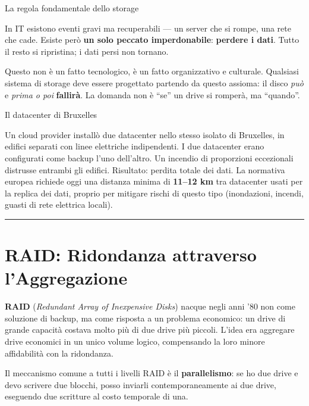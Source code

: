 \documentclass[
  italian,
  openany]{book}
\begin{document}
\begin{calloutwarning}{La regola fondamentale dello storage}

In IT esistono eventi gravi ma recuperabili --- un server che si rompe,
una rete che cade. Esiste però \textbf{un solo peccato imperdonabile}:
\textbf{perdere i dati}. Tutto il resto si ripristina; i dati persi non
tornano.

\end{calloutwarning}

Questo non è un fatto tecnologico, è un fatto organizzativo e culturale.
Qualsiasi sistema di storage deve essere progettato partendo da questo
assioma: il disco \emph{può} e \emph{prima o poi} \textbf{fallirà}. La
domanda non è ``se'' un drive si romperà, ma ``quando''.

\begin{callouttip}{Il datacenter di Bruxelles}

Un cloud provider installò due datacenter nello stesso isolato di
Bruxelles, in edifici separati con linee elettriche indipendenti. I due
datacenter erano configurati come backup l'uno dell'altro. Un incendio
di proporzioni eccezionali distrusse entrambi gli edifici. Risultato:
perdita totale dei dati. La normativa europea richiede oggi una distanza
minima di \textbf{11--12 km} tra datacenter usati per la replica dei
dati, proprio per mitigare rischi di questo tipo (inondazioni, incendi,
guasti di rete elettrica locali).

\end{callouttip}

\begin{center}\rule{0.5\linewidth}{0.5pt}\end{center}

\section{RAID: Ridondanza attraverso
l'Aggregazione}\label{raid-ridondanza-attraverso-laggregazione}

\textbf{RAID} (\emph{Redundant Array of Inexpensive Disks}) nacque negli
anni '80 non come soluzione di backup, ma come risposta a un problema
economico: un drive di grande capacità costava molto più di due drive
più piccoli. L'idea era aggregare drive economici in un unico volume
logico, compensando la loro minore affidabilità con la ridondanza.

Il meccanismo comune a tutti i livelli RAID è il \textbf{parallelismo}:
se ho due drive e devo scrivere due blocchi, posso inviarli
contemporaneamente ai due drive, eseguendo due scritture al costo
temporale di una.
\end{document}
